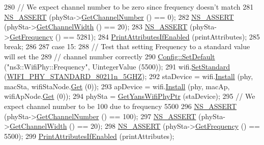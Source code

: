 \begin{DoxyCode}
280       \textcolor{comment}{// We expect channel number to be zero since frequency doesn't match}
281       \hyperlink{assert_8h_a6dccdb0de9b252f60088ce281c49d052}{NS\_ASSERT} (phySta->\hyperlink{classns3_1_1WifiPhy_a5cf0ccf06109ace61db51c83e91b7e8d}{GetChannelNumber} () == 0);
282       \hyperlink{assert_8h_a6dccdb0de9b252f60088ce281c49d052}{NS\_ASSERT} (phySta->\hyperlink{classns3_1_1WifiPhy_a4a5d5009b3b3308f2baeed42a2007189}{GetChannelWidth} () == 20);
283       \hyperlink{assert_8h_a6dccdb0de9b252f60088ce281c49d052}{NS\_ASSERT} (phySta->\hyperlink{classns3_1_1WifiPhy_ad2508d94faf22d690d6b8b4367934fd1}{GetFrequency} () == 5281);
284       \hyperlink{wifi-phy-configuration_8cc_a73f0822e1f64b23097cbff2fc565842f}{PrintAttributesIfEnabled} (printAttributes);
285       \textcolor{keywordflow}{break};
286 
287     \textcolor{keywordflow}{case} 15:
288       \textcolor{comment}{// Test that setting Frequency to a standard value will set the}
289       \textcolor{comment}{// channel number correctly}
290       \hyperlink{group__config_ga2e7882df849d8ba4aaad31c934c40c06}{Config::SetDefault} (\textcolor{stringliteral}{"ns3::WifiPhy::Frequency"}, UintegerValue (5500));
291       wifi.\hyperlink{classns3_1_1WifiHelper_aa54f3e61527ef8de318d310045bc5dfd}{SetStandard} (\hyperlink{group__wifi_gga1299834f4e1c615af3ca738033b76a49aaabe94a0be4668583c42595437b4a6c0}{WIFI\_PHY\_STANDARD\_80211n\_5GHZ});
292       staDevice = wifi.\hyperlink{classns3_1_1WifiHelper_a451b3d33fa1497c22f06c5451f57a127}{Install} (phy, macSta, wifiStaNode.\hyperlink{classns3_1_1NodeContainer_a9ed96e2ecc22e0f5a3d4842eb9bf90bf}{Get} (0));
293       apDevice = wifi.\hyperlink{classns3_1_1WifiHelper_a451b3d33fa1497c22f06c5451f57a127}{Install} (phy, macAp, wifiApNode.\hyperlink{classns3_1_1NodeContainer_a9ed96e2ecc22e0f5a3d4842eb9bf90bf}{Get} (0));
294       phySta = \hyperlink{wifi-phy-configuration_8cc_a50ec12cbf31121934173cb4a44215e73}{GetYansWifiPhyPtr} (staDevice);
295       \textcolor{comment}{// We expect channel number to be 100 due to frequency 5500}
296       \hyperlink{assert_8h_a6dccdb0de9b252f60088ce281c49d052}{NS\_ASSERT} (phySta->\hyperlink{classns3_1_1WifiPhy_a5cf0ccf06109ace61db51c83e91b7e8d}{GetChannelNumber} () == 100);
297       \hyperlink{assert_8h_a6dccdb0de9b252f60088ce281c49d052}{NS\_ASSERT} (phySta->\hyperlink{classns3_1_1WifiPhy_a4a5d5009b3b3308f2baeed42a2007189}{GetChannelWidth} () == 20);
298       \hyperlink{assert_8h_a6dccdb0de9b252f60088ce281c49d052}{NS\_ASSERT} (phySta->\hyperlink{classns3_1_1WifiPhy_ad2508d94faf22d690d6b8b4367934fd1}{GetFrequency} () == 5500);
299       \hyperlink{wifi-phy-configuration_8cc_a73f0822e1f64b23097cbff2fc565842f}{PrintAttributesIfEnabled} (printAttributes);

\end{DoxyCode}
